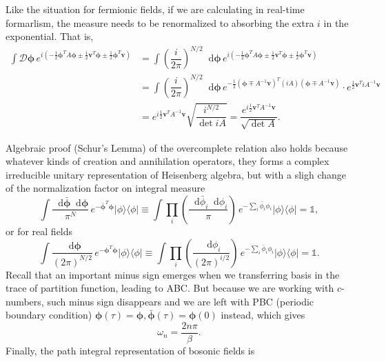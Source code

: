 \documentclass[10pt,nofootinbib]{revtex4}
\newcommand*\dd{\mathop{}\!\mathrm{d}}
\newcounter{Note}[section]
\newenvironment{Note}[1][]{{\par\normalfont\bfseries \underline{Note~\stepcounter{Note}\arabic{Note}.}~#1~~}}{\par}
\newcounter{Lemma}[section]
\begin{document}
	\begin{Note}
		Like the situation for fermionic fields, if we are calculating in real-time formarlism, the measure needs to be renormalized to absorbing the extra $i$ in the exponential. That is,
		\begin{align*}
			\int\mathcal{D}\bm{\phi}\,e^{i(-\frac12\bm{\phi}^T A\bm{\phi}\pm\frac12\bm{v}^T\bm{\phi}\pm\frac12\bm{\phi}^T\bm{v})}&=\int\left(\dfrac{i}{2\pi}\right)^{N/2}\dd\bm{\phi}\,e^{i(-\frac12\bm{\phi}^T A\bm{\phi}\pm\frac12\bm{v}^T\bm{\phi}\pm\frac12\bm{\phi}^T\bm{v})}\\
			&=\int\left(\dfrac{i}{2\pi}\right)^{N/2}\dd\bm{\phi}\,e^{-\frac12(\bm{\phi}\mp A^{-1}\bm{v})^T(iA)(\bm{\phi}\mp A^{-1}\bm{v})}\cdot e^{\frac12\bm{v}^T iA^{-1}\bm{v}}\\
			&=e^{i\frac12\bm{v}^T A^{-1}\bm{v}}\sqrt{\dfrac{i^{N/2}}{\det iA}}=\dfrac{e^{i\frac12\bm{v}^T A^{-1}\bm{v}}}{\sqrt{\det A}}.
		\end{align*}
	\end{Note}
	\indent Algebraic proof (Schur's Lemma) of the overcomplete relation also holds because whatever kinds of creation and annihilation operators, they forms a complex irreducible unitary representation of Heisenberg algebra, but with a sligh change of the normalization factor on integral measure
	\begin{equation}\label{3.3}
		\int\dfrac{\dd\bm{\bar\phi}\dd\bm{\phi}}{\pi^N}\,e^{-\bm{\bar\phi}^T\bm{\phi}}|\phi\rangle\langle\phi|\equiv\int\prod_i \left(\dfrac{\dd\bar\phi_i\dd\phi_i}{\pi}\right)\,e^{-\sum_i\bar\phi_i\phi_i}|\phi\rangle\langle\phi|=\mathds{1},
	\end{equation}
	or for real fields
	\begin{equation}\label{3.4}
		\int\dfrac{\dd\bm{\phi}}{(2\pi)^{N/2}}\,e^{-\bm{\phi}^T\bm{\phi}}|\phi\rangle\langle\phi|\equiv\int\prod_i \left(\dfrac{\dd\phi_i}{(2\pi)^{i/2}}\right)\,e^{-\sum_i\bar\phi_i\phi_i}|\phi\rangle\langle\phi|=\mathds{1}.
	\end{equation}
	\indent Recall that an important minus sign emerges when we transferring basis in the trace of partition function, leading to ABC. But because we are working with $c$-numbers, such minus sign disappears and we are left with PBC (periodic boundary condition) $\bm{\phi}(\tau)=\bm{\phi},\bm{\bar\phi}(\tau)=\bm{\phi}(0)$ instead, which gives
	\begin{equation}\label{3.5}
		\omega_n=\dfrac{2n\pi}{\beta}.
	\end{equation}
	Finally, the path integral representation of bosonic fields is
\end{document}
